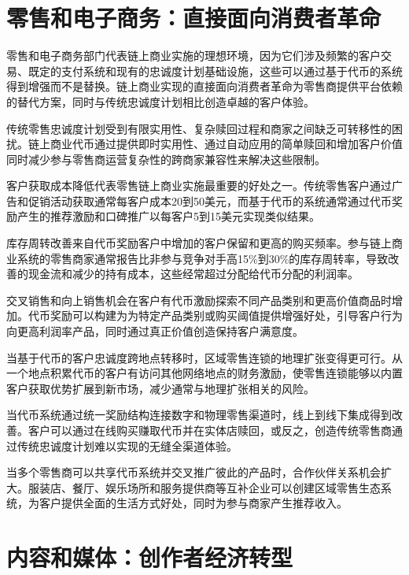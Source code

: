 \documentclass[
  Letterpaper,
]{scrbook}
\begin{document}
\section{零售和电子商务：直接面向消费者革命}\label{ux96f6ux552eux548cux7535ux5b50ux5546ux52a1ux76f4ux63a5ux9762ux5411ux6d88ux8d39ux8005ux9769ux547d}

零售和电子商务部门代表链上商业实施的理想环境，因为它们涉及频繁的客户交易、既定的支付系统和现有的忠诚度计划基础设施，这些可以通过基于代币的系统得到增强而不是替换。链上商业实现的直接面向消费者革命为零售商提供平台依赖的替代方案，同时与传统忠诚度计划相比创造卓越的客户体验。

传统零售忠诚度计划受到有限实用性、复杂赎回过程和商家之间缺乏可转移性的困扰。链上商业代币通过提供即时实用性、通过自动应用的简单赎回和增加客户价值同时减少参与零售商运营复杂性的跨商家兼容性来解决这些限制。

客户获取成本降低代表零售链上商业实施最重要的好处之一。传统零售客户通过广告和促销活动获取通常每客户成本20到50美元，而基于代币的系统通常通过代币奖励产生的推荐激励和口碑推广以每客户5到15美元实现类似结果。

库存周转改善来自代币奖励客户中增加的客户保留和更高的购买频率。参与链上商业系统的零售商家通常报告比非参与竞争对手高15\%到30\%的库存周转率，导致改善的现金流和减少的持有成本，这些经常超过分配给代币分配的利润率。

交叉销售和向上销售机会在客户有代币激励探索不同产品类别和更高价值商品时增加。代币奖励可以构建为为特定产品类别或购买阈值提供增强好处，引导客户行为向更高利润率产品，同时通过真正价值创造保持客户满意度。

当基于代币的客户忠诚度跨地点转移时，区域零售连锁的地理扩张变得更可行。从一个地点积累代币的客户有访问其他网络地点的财务激励，使零售连锁能够以内置客户获取优势扩展到新市场，减少通常与地理扩张相关的风险。

当代币系统通过统一奖励结构连接数字和物理零售渠道时，线上到线下集成得到改善。客户可以通过在线购买赚取代币并在实体店赎回，或反之，创造传统零售商通过传统忠诚度计划难以实现的无缝全渠道体验。

当多个零售商可以共享代币系统并交叉推广彼此的产品时，合作伙伴关系机会扩大。服装店、餐厅、娱乐场所和服务提供商等互补企业可以创建区域零售生态系统，为客户提供全面的生活方式好处，同时为参与商家产生推荐收入。

\section{内容和媒体：创作者经济转型}\label{ux5185ux5bb9ux548cux5a92ux4f53ux521bux4f5cux8005ux7ecfux6d4eux8f6cux578b}
\end{document}
